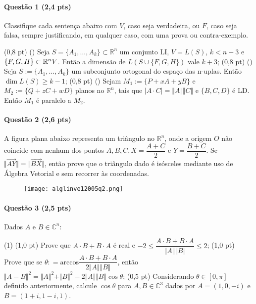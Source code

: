 \documentclass[12pt,a4paper]{article}
\newcommand{\R}{\mathbb{R}}
\newcommand{\C}{\mathbb{C}}
\newcommand{\modu}[1]{\vert #1 \vert}
\newcommand{\norm}[1]{\Vert #1 \Vert}
\begin{document}
\paragraph{Questão 1 (2,4 pts)} Classifique cada sentença abaixo com $V$, caso seja verdadeira, ou $F$, caso seja falsa, sempre justificando, em qualquer caso, com uma prova ou contra-exemplo.
\begin{tasks}
\task (0,8 pt) (\quad) Seja $S=\{A_1, \dots, A_k\}\subset \R^n$ um conjunto LI, $V=L(S)$, $k< n-3$ e $\{F,G,H\}\subset \R^n\\V$. Então a dimensão de $L\left( S \cup \{F,G,H\} \right)$ vale $k+3$;
\task (0,8 pt) (\quad) Seja $S:= \{A_1, \dots, A_k\}$ um subconjunto ortogonal do espaço das n-uplas. Então $\dim L(S) \ge k-1$;
\task (0,8 pt) (\quad) Sejam $M_1 := \{P+xA+yB\}$ e $M_2 := \{Q+zC+wD\}$ planos no $\R^n$, tais que $\modu{A\cdot C} = \norm{A}\norm{C}$ e $\{B,C,D\}$ é LD. Então $M_1$ é paralelo a $M_2$.
\end{tasks}

\paragraph{Questão 2 (2,6 pts)} A figura plana abaixo representa um triângulo no $\R^n$, onde a origem $O$ não coincide com nenhum dos pontos $A, B, C, X = \dfrac{A+C}{2}$ e $Y =\dfrac{B+C}{2}$. Se $\norm{\overrightarrow{AY}} = \norm{\overrightarrow{BX}}$, então prove que o triângulo dado é isósceles mediante uso de Álgebra Vetorial e sem recorrer às coordenadas.

\begin{figure}[h]\centering\texttt{[image: alglinve12005q2.png]}\end{figure}

\paragraph{Questão 3 (2,5 pts)} Dados $A$ e $B\in \C ^n$:

\begin{tasks}(1)
\task (1,0 pt) Prove que $A\cdot B+B\cdot A$ é real e $-2 \le \dfrac{A\cdot B + B\cdot A}{\norm{A}\norm{B}} \le 2$;
\task (1,0 pt) Prove que se $\theta : = \mathrm{arccos} \dfrac{A\cdot B + B\cdot A}{2\norm{A}\norm{B}}$, então $\norm{A-B}^2 = \norm{A}^2 + \norm{B}^2 - 2\norm{A}\norm{B}\cos \theta$;
\task (0,5 pt) Considerando $\theta \in [0,\pi]$ definido anteriormente, calcule $\cos \theta$ para $A, B \in \C^3$ dados por $A=(1,0,-i)$ e $B=(1+i, 1-i, 1)$.
\end{tasks}
\end{document}
